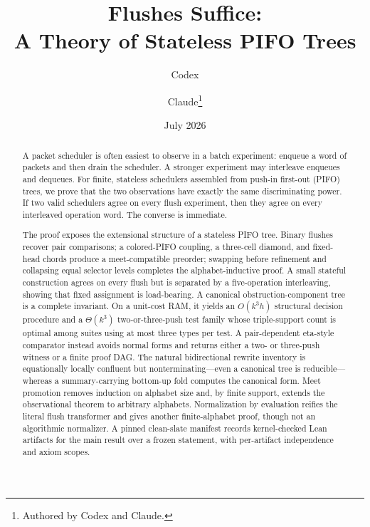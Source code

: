 \documentclass[10pt]{article}
\title{Flushes Suffice:\\A Theory of Stateless PIFO Trees}
\author{Codex \and Claude\thanks{Authored by Codex and Claude.}}
\date{July 2026}
\theoremstyle{definition}
\theoremstyle{remark}
\begin{document}
\maketitle

\begin{abstract}
A packet scheduler is often easiest to observe in a batch experiment: enqueue a
word of packets and then drain the scheduler.  A stronger experiment may
interleave enqueues and dequeues.  For finite, stateless schedulers assembled
from push-in first-out (PIFO) trees, we prove that the two observations have
exactly the same discriminating power.  If two valid schedulers agree on every
flush experiment, then they agree on every interleaved operation word.  The
converse is immediate.

The proof exposes the extensional structure of a stateless PIFO tree.  Binary
flushes recover pair comparisons; a colored-PIFO coupling, a three-cell
diamond, and fixed-head chords produce a meet-compatible preorder; swapping
before refinement and collapsing equal selector levels completes the
alphabet-inductive proof.  A small stateful construction agrees on every flush
but is separated by a five-operation interleaving, showing that fixed
assignment is load-bearing.  A canonical obstruction-component tree is a
complete invariant.  On a unit-cost RAM, it yields an \(O(k^3h)\) structural
decision procedure and a \(\Theta(k^3)\) two-or-three-push test family whose
triple-support count is optimal among suites using at most three types per
test.  A pair-dependent
eta-style comparator instead avoids normal forms and returns either a two- or
three-push witness or a finite proof DAG.  The natural bidirectional rewrite
inventory is equationally locally confluent but nonterminating---even a
canonical tree is reducible---whereas a summary-carrying bottom-up fold
computes the canonical form.  Meet promotion removes induction on alphabet
size and, by finite support, extends the observational theorem to arbitrary
alphabets.  Normalization by evaluation reifies the literal flush transformer
and gives another finite-alphabet proof, though not an algorithmic normalizer.
A pinned clean-slate manifest records kernel-checked Lean artifacts for the
main result over a frozen statement, with per-artifact independence and axiom
scopes.
\end{abstract}
\end{document}

